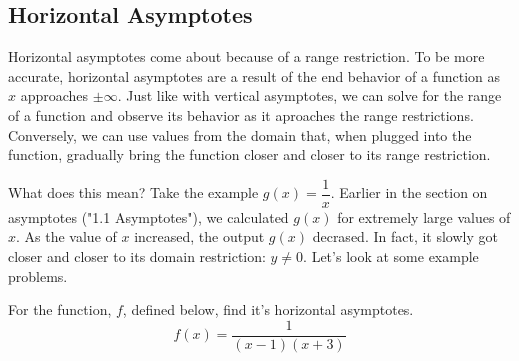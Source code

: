 \clearpage\subsection{Horizontal Asymptotes}
Horizontal asymptotes come about because of a range restriction. To be more accurate, horizontal asymptotes are a result of the end behavior of a function as $x$ approaches $\pm \infty$. Just like with vertical asymptotes, we can solve for the range of a function and observe its behavior as it aproaches the range restrictions. Conversely, we can use values from the domain that, when plugged into the function, gradually bring the function closer and closer to its range restriction.

What does this mean? Take the example $g(x) = \dfrac{1}{x}$. Earlier in the section on asymptotes ("1.1 Asymptotes"), we calculated $g(x)$ for extremely large values of $x$. As the value of $x$ increased, the output $g(x)$ decrased. In fact, it slowly got closer and closer to its domain restriction: $y \ne 0$. Let's look at some example problems.

\begin{problem}
    For the function, $f$, defined below, find it's horizontal asymptotes.
    \[
        f(x) = \frac{1}{(x - 1)(x + 3)}
    \]
\end{problem}

